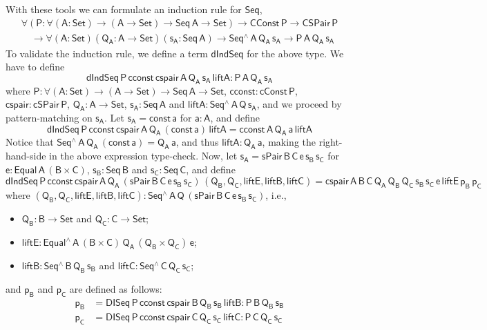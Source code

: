 \documentclass[9pt]{entcs} \usepackage{entcsmacro}
\begin{document}
With these tools we can formulate an induction rule for $\mathsf{Seq}$,
\[
\begin{array}{l}
\mathsf{\forall (P : \forall (A : Set) \to (A \to Set) \to Seq\,A \to Set)}
\mathsf{\to CConst\,P \to CSPair\,P} \\
\quad \mathsf{\to \forall (A : Set)(Q_A : A \to Set)(s_A : Seq\,A) \to Seq^{\wedge}\,A\,Q_A\,s_A \to P\,A\,Q_A\,s_A}
\end{array}
\]
To validate the induction rule, we define a term $\mathsf{dIndSeq}$ for the above type.
We have to define
\[
\mathsf{dIndSeq\,P\,cconst\,cspair\,A\,Q_A\,s_A\,liftA : P\,A\,Q_A\,s_A}
\]
where
$\mathsf{P : \forall (A : Set) \to (A \to Set) \to Seq\,A \to Set}$,
$\mathsf{cconst : cConst\,P}$,
$\mathsf{cspair : cSPair\,P}$,
$\mathsf{Q_A : A \to Set}$, $\mathsf{s_A : Seq\,A}$
and $\mathsf{liftA : Seq^{\wedge}\,A\,Q\,s_A}$,
and we proceed by pattern-matching on $\mathsf{s_A}$.
Let $\mathsf{s_A = const\,a}$ for $\mathsf{a : A}$, and define
\[
\mathsf{dIndSeq\,P\,cconst\,cspair\,A\,Q_A\,(const\,a)\,liftA = cconst\,A\,Q_A\,a\,liftA}
\]
Notice that $\mathsf{Seq^{\wedge}\,A\,Q_A\,(const\,a) = Q_A\,a}$, and thus $\mathsf{liftA : Q_A\,a}$,
making the right-hand-side in the above expression type-check.
Now, let $\mathsf{s_A = sPair\,B\,C\,e\,s_B\,s_C}$
for $\mathsf{e : Equal\,A\,(B \times C)}$, $\mathsf{s_B : Seq\,B}$ and $\mathsf{s_C : Seq\,C}$,
and define
\[
\mathsf{dIndSeq\,P\,cconst\,cspair\,A\,Q_A\,(sPair\,B\,C\,e\,s_B\,s_C)\,(Q_B, Q_C, liftE, liftB, liftC)
	= cspair\,A\,B\,C\,Q_A\,Q_B\,Q_C\,s_B\,s_C\,e\,liftE\,p_B\,p_C}
\]
where $\mathsf{(Q_B, Q_C, liftE, liftB, liftC) : Seq^{\wedge}\,A\,Q\,(sPair\,B\,C\,e\,s_B\,s_C)}$, i.e.,
\begin{itemize}
\item $\mathsf{Q_B : B \to Set}$ and $\mathsf{Q_C : C \to Set}$;
\item $\mathsf{liftE : Equal^{\wedge}\,A\, (B \times C)\, Q_A\, (Q_B \times Q_C) \, e}$;
\item $\mathsf{liftB : Seq^{\wedge}\,B\,Q_B\,s_B}$ and $\mathsf{liftC : Seq^{\wedge}\,C\,Q_C\,s_C}$;
\end{itemize}
and $\mathsf{p_B}$ and $\mathsf{p_C}$ are defined as follows:
\begin{align*}
\mathsf{p_B} &=\mathsf{DISeq\,P\,cconst\,cspair\,B\,Q_B\,s_B\,liftB : P\,B\,Q_B\,s_B} \\
\mathsf{p_C} &=\mathsf{DISeq\,P\,cconst\,cspair\,C\,Q_C\,s_C\,liftC : P\,C\,Q_C\,s_C}
\end{align*}
\end{document}
